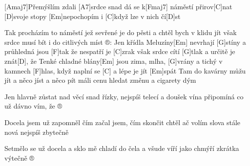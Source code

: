 
[Amaj7]Přemýšlím zdali [A7]srdce snad
dá se k[Fmaj7] náměstí přirov[C]nat
[D]svoje stopy [Em]nepochopím
i [C]když lze v nich čí[D]st

Tak procházím to náměstí
jež sevřené je do pěsti
a chtěl bych v klidu jít však srdce musí bít
i do citlivých míst
®: Jen křídla Meluzíny[Em] nevrhají [G]stíny
a průhledná jsou [F]tak že nespatří je [C]zrak
však srdce cítí [G]tlak a určitě je znát[D], že
Tenké chladné blány[Em] jsou zima, mlha, [G]vrány
a tichý v kamnech [F]hlas, když naplní se [C]
a lépe je jít [Em]spát
Tam do kavárny můžu jít
a něco jíst a něco pít
máli cenu hledat změnu
a cigarety dým

Jen hlavně zůstat nad věcí
snad řízky, nejspíš telecí
a doušek vína připomíná
co už dávno vím, že ®

Docela jsem už zapomněl
čím začal jsem, čím skončit chtěl
ač volím slova stále nová
nejspíš zbytečně

Setmělo se už docela
a sklo mě chladí do čela
a všude víří jako chmýří
zkrátka výtečně ®
